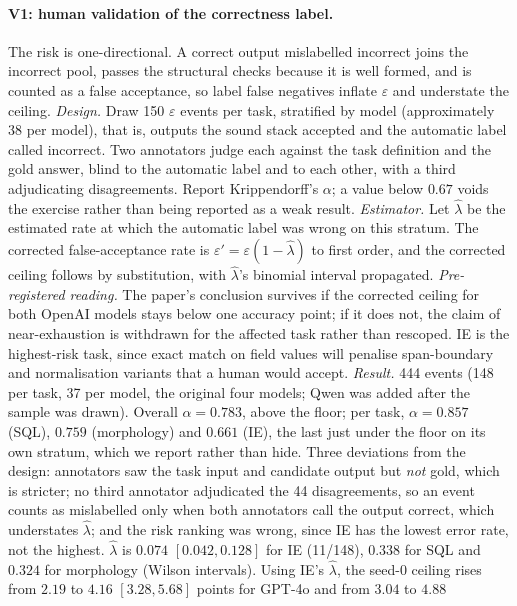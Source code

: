 \documentclass[11pt]{article}
\begin{document}
\paragraph{V1: human validation of the correctness label.} The risk is
one-directional. A correct output mislabelled incorrect joins the incorrect pool,
passes the structural checks because it is well formed, and is counted as a
false acceptance, so label false negatives inflate $\varepsilon$ and understate
the ceiling. \emph{Design.} Draw 150 $\varepsilon$ events per task, stratified by
model (approximately 38 per model), that is, outputs the sound stack accepted and
the automatic label called incorrect. Two annotators judge each against the task
definition and the gold answer, blind to the automatic label and to each other,
with a third adjudicating disagreements. Report Krippendorff's $\alpha$; a value
below $0.67$ voids the exercise rather than being reported as a weak result.
\emph{Estimator.} Let $\hat\lambda$ be the estimated rate at which the automatic
label was wrong on this stratum. The corrected false-acceptance rate is
$\varepsilon' = \varepsilon(1-\hat\lambda)$ to first order, and the corrected
ceiling follows by substitution, with $\hat\lambda$'s binomial interval
propagated. \emph{Pre-registered reading.} The paper's conclusion survives if the
corrected ceiling for both OpenAI models stays below one accuracy point; if it
does not, the claim of near-exhaustion is withdrawn for the affected task rather
than rescoped. IE is the highest-risk task, since exact match on field values
will penalise span-boundary and normalisation variants that a human would accept.
\emph{Result.} 444 events (148 per task, 37 per model, the original four
models; Qwen was added after the sample was drawn). Overall $\alpha=0.783$,
above the floor; per task, $\alpha=0.857$ (SQL), $0.759$ (morphology) and
$0.661$ (IE), the last just under the floor on its own stratum, which we
report rather than hide. Three deviations from the design: annotators saw
the task input and candidate output but \emph{not} gold, which is stricter;
no third annotator adjudicated the 44 disagreements, so an event counts as
mislabelled only when both annotators call the output correct, which
understates $\hat\lambda$; and the risk ranking was wrong, since IE has the
lowest error rate, not the highest. $\hat\lambda$ is $0.074$
$[0.042,0.128]$ for IE (11/148), $0.338$ for SQL and $0.324$ for morphology
(Wilson intervals). Using IE's $\hat\lambda$, the seed-0 ceiling rises from
$2.19$ to $4.16$ $[3.28,5.68]$ points for GPT-4o and from $3.04$ to $4.88$
\end{document}
